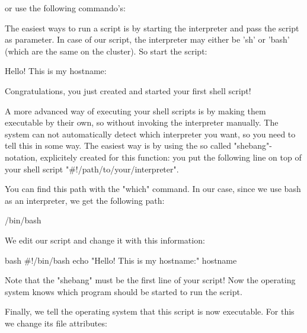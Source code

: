 \begin{prompt}
\end{prompt}

or use the following commando's:
\begin{prompt}
\end{prompt}

The easiest ways to run a script is by starting the interpreter and pass the
script as parameter. In case of our script, the interpreter may either be 'sh'
or 'bash' (which are the same on the cluster). So start the script:

\begin{prompt}
Hello! This is my hostname:
\end{prompt}

Congratulations, you just created and started your first shell script!

A more advanced way of executing your shell scripts is by making them
executable by their own, so without invoking the interpreter manually. The
system can not automatically detect which interpreter you want, so you need to
tell this in some way. The easiest way is by using the so called
"shebang"-notation, explicitely created for this function: you put the
following line on top of your shell script "\#!/path/to/your/interpreter".

You can find this path with the "which" command. In our case, since we use bash
as an interpreter, we get the following path:

\begin{prompt}
/bin/bash
\end{prompt}

We edit our script and change it with this information:

\begin{code}{bash}
#!/bin/bash
echo "Hello! This is my hostname:"
hostname
\end{code}

Note that the "shebang" must be the first line of your script! Now the
operating system knows which program should be started to run the script.

Finally, we tell the operating system that this script is now executable. For
this we change its file attributes:

\begin{prompt}
\end{prompt}

